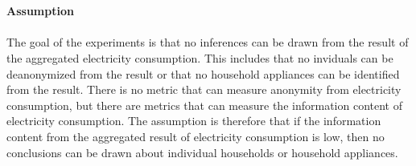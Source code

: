 \\
\\
\textbf{Assumption}
\\
\\
The goal of the experiments is that no inferences can be drawn from the result of the aggregated electricity consumption. This includes that no inviduals can be deanonymized from the result or that no household appliances can be identified from the result. There is no metric that can measure anonymity from electricity consumption, but there are metrics that can measure the information content of electricity consumption. The assumption is therefore that if the information content from the aggregated result of electricity consumption is low, then no conclusions can be drawn about individual households or household appliances.
\\
\\
